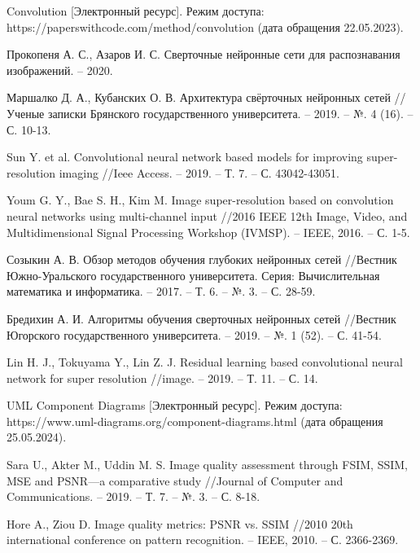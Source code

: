 \begin{thebibliography}{3}
    Convolution [Электронный ресурс]. Режим доступа: https://paperswithcode.com/method/convolution (дата обращения 22.05.2023).

    Прокопеня А. С., Азаров И. С. Сверточные нейронные сети для распознавания изображений. – 2020.

    Маршалко Д. А., Кубанских О. В. Архитектура свёрточных нейронных сетей //Ученые записки Брянского государственного университета. – 2019. – №. 4 (16). – С. 10-13.

    Sun Y. et al. Convolutional neural network based models for improving super-resolution imaging //Ieee Access. – 2019. – Т. 7. – С. 43042-43051.

    Youm G. Y., Bae S. H., Kim M. Image super-resolution based on convolution neural networks using multi-channel input //2016 IEEE 12th Image, Video, and Multidimensional Signal Processing Workshop (IVMSP). – IEEE, 2016. – С. 1-5.
    
    Созыкин А. В. Обзор методов обучения глубоких нейронных сетей //Вестник Южно-Уральского государственного университета. Серия: Вычислительная математика и информатика. – 2017. – Т. 6. – №. 3. – С. 28-59.

    Бредихин А. И. Алгоритмы обучения сверточных нейронных сетей //Вестник Югорского государственного университета. – 2019. – №. 1 (52). – С. 41-54.

    Lin H. J., Tokuyama Y., Lin Z. J. Residual learning based convolutional neural network for super resolution //image. – 2019. – Т. 11. – С. 14.

    UML Component Diagrams [Электронный ресурс]. Режим доступа: https://www.uml-diagrams.org/component-diagrams.html (дата обращения 25.05.2024).

    Sara U., Akter M., Uddin M. S. Image quality assessment through FSIM, SSIM, MSE and PSNR—a comparative study //Journal of Computer and Communications. – 2019. – Т. 7. – №. 3. – С. 8-18.

    Hore A., Ziou D. Image quality metrics: PSNR vs. SSIM //2010 20th international conference on pattern recognition. – IEEE, 2010. – С. 2366-2369.
\end{thebibliography}
